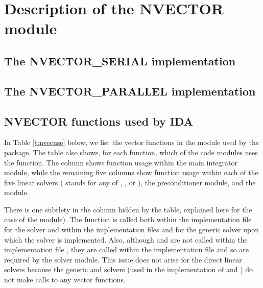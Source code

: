 \chapter{Description of the NVECTOR module}\label{s:nvector}


\section{The NVECTOR\_SERIAL implementation}\label{ss:nvec_ser}


\section{The NVECTOR\_PARALLEL implementation}\label{ss:nvec_par}


\section{NVECTOR functions used by IDA}

In Table \ref{t:nvecuse} below, we list the vector functions in the 
{\nvector} module used by the {\ida} package.
The table also shows, for each function, which of the code modules uses
the function. The {\ida} column shows function usage within the main
integrator module, while the remaining five columns show function usage
within each of the five {\ida} linear solvers ({\idaspils} stands for any
of {\idaspgmr}, {\idaspbcg}, or {\idasptfqmr}), the {\idabbdpre}
preconditioner module, and the {\fida} module.

There is one subtlety in the {\idaspils} column hidden by the table, explained
here for the case of the {\idaspgmr} module). 
The  function is called both within the 
implementation file  for the {\idaspgmr} solver and within
the implementation files  and  for the generic
{\spgmr} solver upon which the {\idaspgmr} solver is implemented. Also, although
 and  are not called within the implementation file
, they are called within the implementation file
 and so are required by the {\idaspgmr} solver module.
This issue does not arise for the direct {\ida} linear solvers because
the generic {\dense} and {\band} solvers (used in the implementation of
{\idadense} and {\idaband}) do not make calls to any vector functions.

